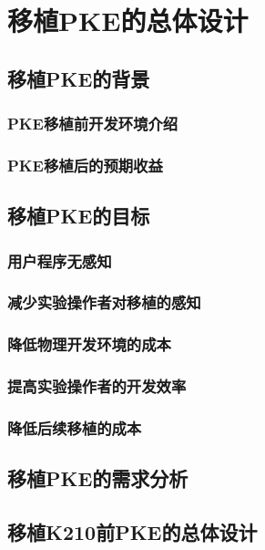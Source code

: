 \chapter{移植PKE的总体设计}

\section{移植PKE的背景}

\subsection{PKE移植前开发环境介绍}

\subsection{PKE移植后的预期收益}

\section{移植PKE的目标}

\subsection{用户程序无感知}

\subsection{减少实验操作者对移植的感知}

\subsection{降低物理开发环境的成本}

\subsection{提高实验操作者的开发效率}

\subsection{降低后续移植的成本}

\section{移植PKE的需求分析}

\section{移植K210前PKE的总体设计}

